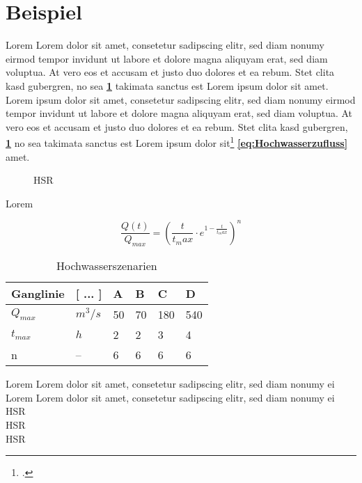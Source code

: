 \section*{Beispiel}


Lorem Lorem dolor sit amet, consetetur sadipscing elitr, sed diam nonumy eirmod tempor invidunt ut labore et dolore magna aliquyam erat, sed diam voluptua. At vero eos et accusam et justo duo dolores et \autocite[22]{Roppel2006} ea rebum. Stet clita kasd gubergren, no sea \textbf{\ref{tab:Hochwasserszenarien}} takimata sanctus est Lorem ipsum dolor sit amet. Lorem ipsum dolor sit amet, consetetur sadipscing elitr, sed diam nonumy eirmod tempor invidunt ut labore et dolore magna aliquyam erat, sed diam voluptua. At vero eos et accusam et justo duo dolores et ea rebum. Stet clita kasd gubergren, \textbf{\ref{fig:HSR}} no sea takimata sanctus est Lorem ipsum dolor sit\footcite{Roppel2006} \textbf{\ref{eq:Hochwasserzufluss}} amet.

\begin{figure}[ht]
	\centering
	\caption{\acs{HSR} \autocite{IR}}
	\label{fig:HSR}
\end{figure}

Lorem

 \begin{equation}\label{eq:Hochwasserzufluss}
\frac{Q(t)}{Q_{max}} = \left(\frac{t}{t_max}\cdot e^{1-\frac{t}{t_max}} \right)^n
\end{equation}

\begin{table}[ht]
    \centering
	\begin{tabular}{|l|l|l|l|l|l|}
		\hline 
		\textbf{Ganglinie}	&\textbf{[ ... ]}  	& \textbf{A} 	 & \textbf{B}  	& \textbf{C} 	& \textbf{D}  \\ 
		\hline 
		$ Q_{max} $			& $ m^3/s $ 		& 50 			& 70		  	& 180			& 540 \\ 
		\hline 
		$ t_{max} $			& $ h $ 			& 2  			& 2 			& 3 			& 4 \\ 
		\hline 
		n					& --  				& 6  			& 6 			& 6 			& 6  \\ 
		\hline 
	\end{tabular} 
	\caption{Hochwasserszenarien}\label{tab:Hochwasserszenarien}
\end{table}

Lorem  Lorem dolor sit amet, consetetur sadipscing elitr, sed diam nonumy ei\\

Lorem  Lorem dolor sit amet, consetetur sadipscing elitr, sed diam nonumy ei \\
\ac{HSR}\\
\acs{HSR}\\
\acl{HSR}


\clearpage